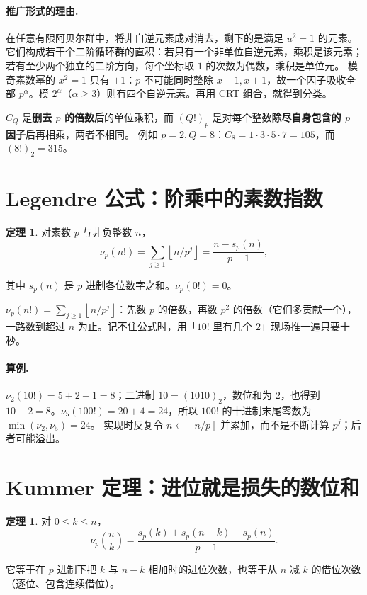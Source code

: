 \documentclass[UTF8,a4paper,11pt,twoside,openright,fontset=fandol]{ctexbook}
\theoremstyle{definition}
\newtheorem{theorem}[definition]{定理}
\newcommand{\floor}[1]{\left\lfloor #1\right\rfloor}
\begin{document}
\paragraph{推广形式的理由.}
在任意有限阿贝尔群中，将非自逆元素成对消去，剩下的是满足 $u^2=1$ 的元素。它们构成若干个二阶循环群的直积：若只有一个非单位自逆元素，乘积是该元素；若有至少两个独立的二阶方向，每个坐标取 $1$ 的次数为偶数，乘积是单位元。
模奇素数幂的 $x^2=1$ 只有 $\pm1$：$p$ 不可能同时整除 $x-1,x+1$，故一个因子吸收全部 $p^\alpha$。模 $2^\alpha$（$\alpha\ge3$）则有四个自逆元素。再用 CRT 组合，就得到分类。
\begin{pitfall}
$C_Q$ 是\textbf{删去 $p$ 的倍数后}的单位乘积，而 $(Q!)_p$ 是对每个整数\textbf{除尽自身包含的 $p$ 因子}后再相乘，两者不相同。
例如 $p=2,Q=8$：$C_8=1\cdot3\cdot5\cdot7=105$，而 $(8!)_2=315$。
\end{pitfall}


\section{Legendre 公式：阶乘中的素数指数}
\begin{theorem}
对素数 $p$ 与非负整数 $n$，
\[
 \nu_p(n!)=\sum_{j\ge1}\floor{n/p^j}
 =\frac{n-s_p(n)}{p-1},
\]


其中 $s_p(n)$ 是 $p$ 进制各位数字之和。$\nu_p(0!)=0$。
\end{theorem}

\begin{tip}[一句话版]
$\nu_p(n!)=\sum_{j\ge1}\floor{n/p^j}$：先数 $p$ 的倍数，再数 $p^2$ 的倍数（它们多贡献一个），一路数到超过 $n$ 为止。记不住公式时，用「$10!$ 里有几个 $2$」现场推一遍只要十秒。
\end{tip}

\paragraph{算例.} $\nu_2(10!)=5+2+1=8$；二进制 $10=(1010)_2$，数位和为 $2$，也得到 $10-2=8$。$\nu_5(100!)=20+4=24$，所以 $100!$ 的十进制末尾零数为 $\min(\nu_2,\nu_5)=24$。
实现时反复令 $n\gets\floor{n/p}$ 并累加，而不是不断计算 $p^j$；后者可能溢出。


\section{Kummer 定理：进位就是损失的数位和}
\begin{theorem}
对 $0\le k\le n$，
\[
\nu_p\binom nk=\frac{s_p(k)+s_p(n-k)-s_p(n)}{p-1}.
\]


它等于在 $p$ 进制下把 $k$ 与 $n-k$ 相加时的进位次数，也等于从 $n$ 减 $k$ 的借位次数（逐位、包含连续借位）。
\end{theorem}
\end{document}
